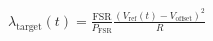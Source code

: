 \documentclass[convert={outext=.svg,density=750}]{standalone}
\begin{document}
$
    \lambda_{\text{target}}(t)=\frac{\text{FSR}}{P_{\text{FSR}}} \frac{(V_\text{ref}(t)-V_\text{offset})^2}{R}
$
\end{document}
